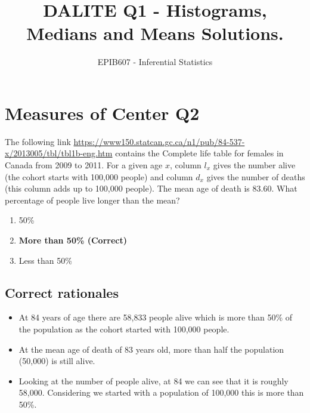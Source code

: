 \documentclass[letterpaper,10pt,twoside,printwatermark=false]{pinp}
\title{DALITE Q1 - Histograms, Medians and Means Solutions.}
\author[a]{EPIB607 - Inferential Statistics}
\affil[a]{Fall 2018, McGill University}
\providecommand{\tightlist}{%
  \setlength{\itemsep}{0pt}\setlength{\parskip}{0pt}}
\begin{document}
\verticaladjustment{-2pt}

\maketitle
\thispagestyle{firststyle}



\section{Measures of Center Q2}\label{measures-of-center-q2}

The following link
\url{https://www150.statcan.gc.ca/n1/pub/84-537-x/2013005/tbl/tbl1b-eng.htm}
contains the Complete life table for females in Canada from 2009 to
2011. For a given age \(x\), column \(l_x\) gives the number alive (the
cohort starts with 100,000 people) and column \(d_x\) gives the number
of deaths (this column adds up to 100,000 people). The mean age of death
is 83.60. What percentage of people live longer than the mean?

\begin{enumerate}
\def\labelenumi{\alph{enumi})}
\tightlist
\item
  50\%
\item
  \textbf{More than 50\% (Correct)}
\item
  Less than 50\%
\end{enumerate}

\subsection{Correct rationales}\label{correct-rationales}

\begin{itemize}
\tightlist
\item
  At 84 years of age there are 58,833 people alive which is more than
  50\% of the population as the cohort started with 100,000 people.
\item
  At the mean age of death of 83 years old, more than half the
  population (50,000) is still alive.
\item
  Looking at the number of people alive, at 84 we can see that it is
  roughly 58,000. Considering we started with a population of 100,000
  this is more than 50\%.
\end{itemize}
\end{document}
